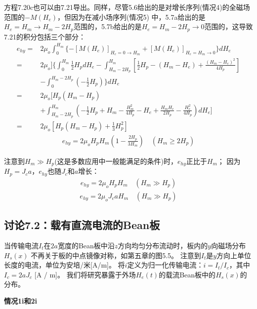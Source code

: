 方程7.20c也可以由7.21导出。同样，尽管5.6给出的是对增长序列(情况4)的全磁场范围的$-M(H_e)$，但因为在减小场序列(情况5)
中，5.7a给出的是$H_e=H_m\rightarrow H_m-2H_p$范围的，5.7b给出的是$H_e=H_m-2H_p\rightarrow 0$范围的，这导致
7.21的积分包括三个部分：
\begin{align*}%
e_{hy}=&2\mu_o\int_{0}^{H_m}\{-[M(H_e)]_{H_e=0\rightarrow H_m}+[M(H_e)]_{H_e=H_m\rightarrow 0}\}dH_e \\\tag{7.21}
=&2\mu_o]\big\{\int_{0}^{H_m}\frac{1}{2}H_pdH_e 
-\int_{H_m-2H_p}^{H_m}\left[\frac{1}{2}H_p-(H_m-H_e)+\frac{(H_m-H_e)^2}{4H_p}\right]\\
&-\int_{0}^{H_m-2H_p}(-\frac{1}{2}H_p)\big\}dH_e\\ 
=&2\mu_o\big[H_p(H_m-H_p)\\ 
&+\int_{H_m-2H_p}^{H_m}\left(-\frac{1}{2}H_p+H_m-\frac{H_{m}^{2}}{4H_p}-H_e+\frac{H_mH_e}{2H_p}-\frac{H_{e}^{2}}{4H_p}\right)dH_e\big] \\
=&2\mu_o[H_p(H_m-H_p)+\frac{1}{3}H_{p}^{2}]
\end{align*}
\begin{align*}
e_{hy}=2\mu_oH_pH_m\left(1-\frac{2H_p}{3H_m}\right)   \quad  (H_m\geq 2H_p) \tag{7.20c}
\end{align*}

注意到$H_m\gg H_p$(这是多数应用中一般能满足的条件)时，$e_{hy}$正比于$H_m$；
因为$H_p=J_c a$，$e_{hy}$也随$J_c$和$a$增长：
\begin{align*}%
e_{hy}=2\mu_oH_pH_m \quad  (H_m\gg H_p) \tag{7.20d}
\end{align*}
\begin{align*}
e_{hy}=2\mu_oJ_caH_m \quad (H_m\gg H_p) \tag{7.20e}
\end{align*}


\subsection{讨论7.2：载有直流电流的Bean板}
当传输电流$I_t$在$2a$宽度的Bean板中沿$z$方向均匀分布流动时，板内的$y$向磁场分布$H_s(x)$
不再关于板的中点镜像对称，如第五章的图5.5。
注意到$I_t$是$y$方向上单位长度的电流，单位为安培/米[A/m]。
将$i$定义为归一化传输电流：$i= I_t / I_c$，其中$I_c = 2a J_c$ [A / m]。 我们将研究暴露于外场$H_e(t)$的载流Bean板中的$H_s(x)$的分布。

\textbf{情况1i和2i}

